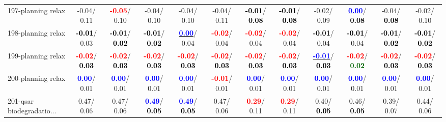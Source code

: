 \begin{table}[h]
\begin{center}
{\begin{tabular}{lc|c|c|c|c|c|c|c|c|c|c}
197-planning relax &  -0.04/  0.11 & \textcolor{red}{\textbf{ -0.05}}/  0.10 &  -0.04/  0.10 &  -0.04/  0.10 &  -0.04/  0.11 & \textcolor{black}{\textbf{ -0.01}}/\textcolor{black}{\textbf{  0.08}} & \textcolor{black}{\textbf{ -0.01}}/\textcolor{black}{\textbf{  0.08}} &  -0.02/  0.09 & \underline{\textcolor{blue}{\textbf{  0.00}}}/\textcolor{black}{\textbf{  0.08}} &  -0.04/\textcolor{black}{\textbf{  0.08}} &  -0.02/  0.10 \\
198-planning relax & \textcolor{black}{\textbf{ -0.01}}/  0.03 & \textcolor{black}{\textbf{ -0.01}}/\textcolor{black}{\textbf{  0.02}} & \textcolor{black}{\textbf{ -0.01}}/\textcolor{black}{\textbf{  0.02}} & \underline{\textcolor{blue}{\textbf{  0.00}}}/  0.04 & \textcolor{red}{\textbf{ -0.02}}/  0.04 & \textcolor{red}{\textbf{ -0.02}}/  0.04 & \textcolor{red}{\textbf{ -0.02}}/  0.04 & \textcolor{black}{\textbf{ -0.01}}/  0.04 & \textcolor{black}{\textbf{ -0.01}}/  0.04 & \textcolor{black}{\textbf{ -0.01}}/\textcolor{black}{\textbf{  0.02}} & \textcolor{black}{\textbf{ -0.01}}/\textcolor{black}{\textbf{  0.02}} \\
199-planning relax & \textcolor{red}{\textbf{ -0.02}}/\textcolor{black}{\textbf{  0.03}} & \textcolor{red}{\textbf{ -0.02}}/\textcolor{black}{\textbf{  0.03}} & \textcolor{red}{\textbf{ -0.02}}/\textcolor{black}{\textbf{  0.03}} & \textcolor{red}{\textbf{ -0.02}}/\textcolor{black}{\textbf{  0.03}} & \textcolor{red}{\textbf{ -0.02}}/\textcolor{black}{\textbf{  0.03}} & \textcolor{red}{\textbf{ -0.02}}/\textcolor{black}{\textbf{  0.03}} & \textcolor{red}{\textbf{ -0.02}}/\textcolor{black}{\textbf{  0.03}} & \underline{\textcolor{blue}{\textbf{ -0.01}}}/\textcolor{black}{\textbf{  0.03}} & \textcolor{red}{\textbf{ -0.02}}/\textcolor{darkgreen}{\textbf{  0.02}} & \textcolor{red}{\textbf{ -0.02}}/\textcolor{black}{\textbf{  0.03}} & \textcolor{red}{\textbf{ -0.02}}/\textcolor{black}{\textbf{  0.03}} \\ \hline
200-planning relax & \textcolor{blue}{\textbf{  0.00}}/  0.01 & \textcolor{blue}{\textbf{  0.00}}/  0.01 & \textcolor{blue}{\textbf{  0.00}}/  0.01 & \textcolor{blue}{\textbf{  0.00}}/  0.01 & \textcolor{red}{\textbf{ -0.01}}/  0.01 & \textcolor{blue}{\textbf{  0.00}}/  0.01 & \textcolor{blue}{\textbf{  0.00}}/  0.01 & \textcolor{blue}{\textbf{  0.00}}/  0.01 & \textcolor{blue}{\textbf{  0.00}}/  0.01 & \textcolor{blue}{\textbf{  0.00}}/  0.01 & \textcolor{blue}{\textbf{  0.00}}/  0.01 \\
201-qsar biodegradatio... &   0.47/  0.06 &   0.47/  0.06 & \textcolor{blue}{\textbf{  0.49}}/\textcolor{black}{\textbf{  0.05}} & \textcolor{blue}{\textbf{  0.49}}/\textcolor{black}{\textbf{  0.05}} &   0.47/  0.06 & \textcolor{red}{\textbf{  0.29}}/  0.11 & \textcolor{red}{\textbf{  0.29}}/  0.11 &   0.40/\textcolor{black}{\textbf{  0.05}} &   0.46/\textcolor{black}{\textbf{  0.05}} &   0.39/  0.07 &   0.44/  0.06 \\

\end{tabular}}
\end{center}
\end{table}
